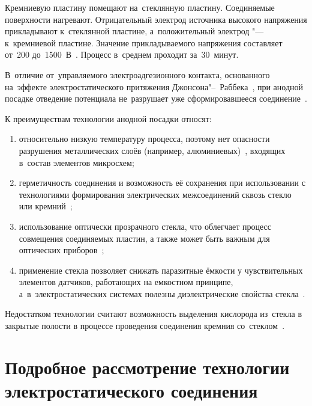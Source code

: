 Кремниевую пластину помещают на~стеклянную пластину. Соединяемые
поверхности нагревают. Отрицательный электрод источника высокого напряжения
 прикладывают к~стеклянной пластине, а~положительный электрод "---
к~кремниевой пластине. Значение прикладываемого напряжения составляет от~200
до~1500~В~\cites[484]{lit_madou2002fundamentals}{Khomenko1982useglassproperties, Khomenko1990physprocess}. Процесс в~среднем проходит за~30~минут.

В~отличие от~управляемого электроадгезионного контакта, основанного на~эффекте электростатического притяжения Джонсона"--~Раббека~\cite{johnsen1923physical,atkinson1969simple}, при анодной посадке отведение потенциала не~разрушает уже сформировавшееся соединение~\cite{evdokimov1968issledovanie_avtoref}.

К преимуществам технологии анодной посадки относят:
\begin{enumerate}
    \renewcommand{\labelenumi}{\asbuk{enumi})}
    \item относительно низкую температуру процесса, поэтому нет опасности разрушения
    металлических слоёв (например, алюминиевых)~\cite{Low_temp_wafer_AB}, входящих
    в~состав элементов микросхем;
    \item герметичность соединения и возможность её сохранения при использовании с
    технологиями формирования электрических межсоединений сквозь стекло или
    кремний~\cite{lee_rogers2011ssi_design_rules_wlp};
    \item использование оптически прозрачного стекла, что облегчает процесс
    совмещения соединяемых пластин, а также может быть важным для оптических
    приборов~\cite{shoji1998low_b_quartz};
    \item применение стекла позволяет снижать паразитные ёмкости у чувствительных
    элементов датчиков, работающих на емкостном принципе, а~в~электростатических
    системах полезны диэлектрические свойства стекла~\cite{shoji1998low_b_quartz}.
\end{enumerate}

Недостатком технологии считают возможность выделения кислорода из~стекла
в закрытые полости в процессе проведения соединения кремния
со~стеклом~\cites{lit_Esashi_Wafer2008,lee_rogers2011ssi_design_rules_wlp}[С.~3-20]{gad2006mems_applications}{barinov2015_datchik_zhestk,Rogers1992considerations,timoshenkov2010metody}.

\section{Подробное рассмотрение технологии электростатического соединения}

